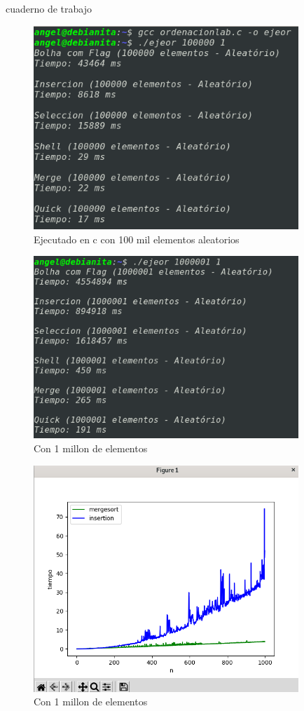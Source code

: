 \documentclass[a4paper]{article}
\begin{document}
cuaderno de trabajo
\cite{colab}


\begin{figure}[H]%

\centering
\includegraphics[width=10cm]{imagenes/t100milc.png}
\caption{Ejecutado en c con 100 mil elementos aleatorios}

\end{figure}

\begin{figure}[H]%

\centering
\includegraphics[width=10cm]{imagenes/millon.png}
\caption{Con 1 millon de elementos}

\end{figure}


\begin{figure}[H]%

\centering
\includegraphics[width=10cm]{imagenes/merge.png}
\caption{Con 1 millon de elementos}

\end{figure}
\end{document}
